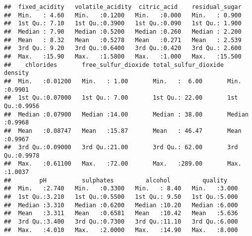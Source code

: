 \documentclass{article}
\begin{document}
\begin{Shaded}
\begin{Highlighting}[]
\end{Highlighting}
\end{Shaded}

\begin{verbatim}
##  fixed_acidity   volatile_acidity  citric_acid    residual_sugar  
##  Min.   : 4.60   Min.   :0.1200   Min.   :0.000   Min.   : 0.900  
##  1st Qu.: 7.10   1st Qu.:0.3900   1st Qu.:0.090   1st Qu.: 1.900  
##  Median : 7.90   Median :0.5200   Median :0.260   Median : 2.200  
##  Mean   : 8.32   Mean   :0.5278   Mean   :0.271   Mean   : 2.539  
##  3rd Qu.: 9.20   3rd Qu.:0.6400   3rd Qu.:0.420   3rd Qu.: 2.600  
##  Max.   :15.90   Max.   :1.5800   Max.   :1.000   Max.   :15.500  
##    chlorides       free_sulfur_dioxide total_sulfur_dioxide    density      
##  Min.   :0.01200   Min.   : 1.00       Min.   :  6.00       Min.   :0.9901  
##  1st Qu.:0.07000   1st Qu.: 7.00       1st Qu.: 22.00       1st Qu.:0.9956  
##  Median :0.07900   Median :14.00       Median : 38.00       Median :0.9968  
##  Mean   :0.08747   Mean   :15.87       Mean   : 46.47       Mean   :0.9967  
##  3rd Qu.:0.09000   3rd Qu.:21.00       3rd Qu.: 62.00       3rd Qu.:0.9978  
##  Max.   :0.61100   Max.   :72.00       Max.   :289.00       Max.   :1.0037  
##        pH          sulphates         alcohol         quality     
##  Min.   :2.740   Min.   :0.3300   Min.   : 8.40   Min.   :3.000  
##  1st Qu.:3.210   1st Qu.:0.5500   1st Qu.: 9.50   1st Qu.:5.000  
##  Median :3.310   Median :0.6200   Median :10.20   Median :6.000  
##  Mean   :3.311   Mean   :0.6581   Mean   :10.42   Mean   :5.636  
##  3rd Qu.:3.400   3rd Qu.:0.7300   3rd Qu.:11.10   3rd Qu.:6.000  
##  Max.   :4.010   Max.   :2.0000   Max.   :14.90   Max.   :8.000
\end{verbatim}

\begin{Shaded}
\begin{Highlighting}[]
\OtherTok{=} 
 \NormalTok{, } \NormalTok{, }
          \NormalTok{, } \NormalTok{, }
          \NormalTok{, } \NormalTok{)}
\end{Highlighting}
\end{Shaded}
\end{document}
